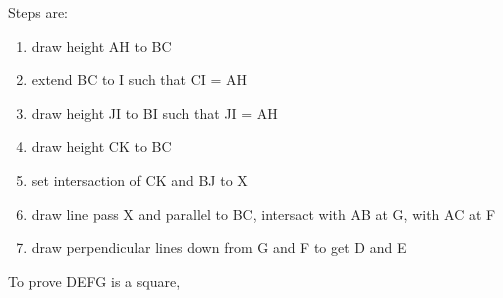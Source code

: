 \documentclass[10pt]{article}
\begin{document}
	
	\noindent
	Steps are:
	\begin{enumerate}
		\item draw height AH to BC
		\item extend BC to I such that CI = AH
		\item draw height JI to BI such that JI = AH
		\item draw height CK to BC
		\item set intersaction of CK and BJ to X
		\item draw line pass X and parallel to BC, intersact with AB at G, with AC at F
		\item draw perpendicular lines down from G and F to get D and E		
	\end{enumerate}
	To prove DEFG is a square, 
\end{document}
